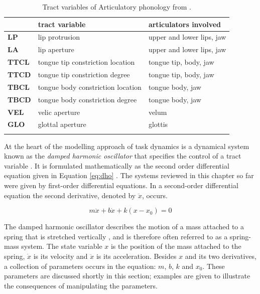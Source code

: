 \begin{table}
\caption{Tract variables of Articulatory phonology from \citet[73]{BrowmanGoldstein1989}.}
\begin{tabularx}{\textwidth}{Xll}
	\lsptoprule
&			\textbf{tract variable} &			\textbf{articulators involved}\\
\midrule
\textbf{LP} &		lip protrusion &				upper and lower lips, jaw\\
\textbf{LA} &		lip aperture &				upper and lower lips, jaw\\
\textbf{TTCL} &	tongue tip constriction location &	tongue tip, body, jaw \\
\textbf{TTCD} &	tongue tip constriction degree &		tongue tip, body, jaw \\
\textbf{TBCL} &	tongue body constriction location &	tongue body, jaw \\
\textbf{TBCD} &	tongue body constriction degree &	tongue body, jaw \\
\textbf{VEL} &	velic aperture &				velum \\
\textbf{GLO} &	glottal aperture &				glottis \\
  \lspbottomrule
\end{tabularx}
\label{tab:tract_vars}
\end{table}%

At the heart of the modelling approach of task dynamics is a dynamical\largerpage{} system known as the \emph{damped harmonic oscillator} that specifies the control of a tract variable \citep{Hawkins1992}. It is formulated mathematically as the second order differential equation given in Equation \ref{eq:dho} \citep{SaltzmanKelso1987}. The systems reviewed in this chapter so far were given by first-order differential equations. In a second-order differential equation the second derivative, denoted by $\ddot{x}$, occurs.

\begin{equation}
m\ddot{x} + b\dot{x} + k(x-x_0) = 0
\label{eq:dho}
\end{equation}

The damped harmonic oscillator describes the motion of a mass attached to a spring that is stretched vertically \citep{FeynmanLeightonSands1963}, and is therefore often referred to as a spring-mass system. The state variable $x$ is the position of the mass attached to the spring, $\dot{x}$ is its velocity and $\ddot{x}$ is its acceleration. Besides $x$ and its two derivatives, a collection of parameters occurs in the equation: $m$, $b$, $k$ and $x_0$. These parameters are discussed shortly in this section; examples are given to illustrate the consequences of manipulating the parameters. 

